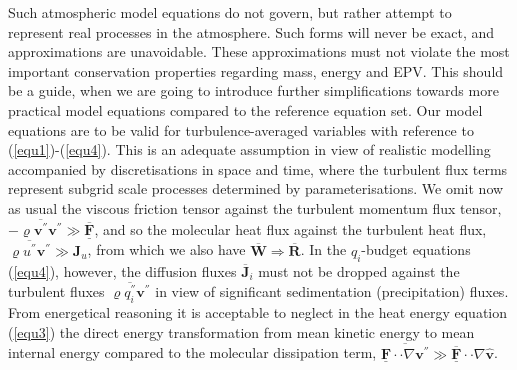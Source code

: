 Such atmospheric model equations do not govern, but rather attempt to represent real processes in the atmosphere. Such forms will never be exact, and approximations are unavoidable. These approximations must not violate the most important conservation properties regarding mass, energy and EPV. This should be a guide, when we are going to introduce further simplifications towards more practical model equations compared to the reference equation set. Our model equations are to be valid for turbulence-averaged variables with reference to (\ref{equ1})-(\ref{equ4}). This is an adequate assumption in view of realistic modelling accompanied by discretisations in space and time, where the turbulent flux terms represent subgrid scale processes determined by parameterisations.  We omit now as usual the viscous friction tensor against the turbulent momentum flux tensor, $-\overline{\varrho \mathbf{v}^{''} \mathbf{v}^{''}}\gg \overline{\underline{\mathbf{F}}}$, and so the molecular heat flux against the turbulent heat flux, $\overline{\varrho u^{''}\mathbf{v}^{''}}\gg \mathbf{J}_u$, from which we also have $\overline{\mathbf{W}}\Rightarrow \overline{\mathbf{R}}$. In the $\hat{q}_{i}$-budget equations (\ref{equ4}), however, the diffusion fluxes $\overline{\mathbf{J}}_{i}$ must not be dropped against the turbulent fluxes $\overline{\varrho q_{i}^{''}\mathbf{v}^{''}}$ in view of significant sedimentation (precipitation) fluxes. From energetical reasoning it is acceptable to neglect in the heat energy equation (\ref{equ3}) the direct energy transformation from mean kinetic energy to mean internal energy compared to the molecular dissipation term, $\overline{\underline{\mathbf{F}}\cdot\cdot\nabla \mathbf{v}^{''}} \gg \underline{\overline{\mathbf{F}}}\cdot\cdot\nabla\hat{\mathbf{v}}$.


